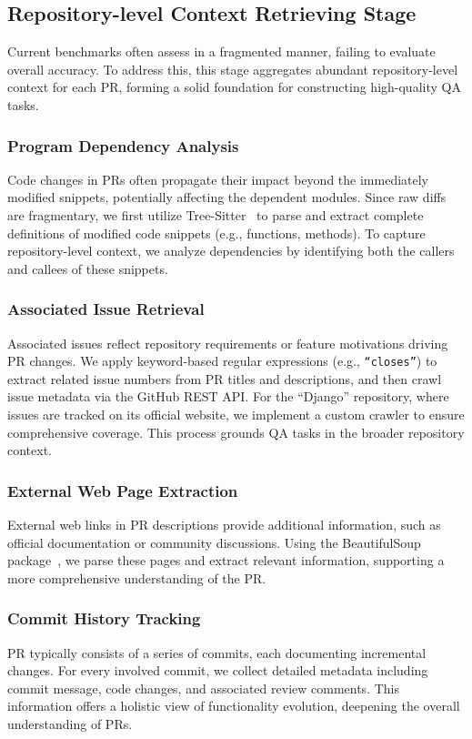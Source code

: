 \subsection{Repository-level Context Retrieving Stage}
\label{sec:stage2}

Current benchmarks often assess in a fragmented manner, failing to evaluate overall accuracy. To address this, this stage aggregates abundant repository-level context for each PR, forming a solid foundation for constructing high-quality QA tasks.

\subsubsection{Program Dependency Analysis}

Code changes in PRs often propagate their impact beyond the immediately modified snippets, potentially affecting the dependent modules. Since raw diffs are fragmentary, we first utilize Tree-Sitter~\cite{tree-sitter} to parse and extract complete definitions of modified code snippets (e.g., functions, methods). To capture repository-level context, we analyze dependencies by identifying both the callers and callees of these snippets. 

\subsubsection{Associated Issue Retrieval}
Associated issues reflect repository requirements or feature motivations driving PR changes. We apply keyword-based regular expressions (e.g., \texttt{``closes''}) to extract related issue numbers from PR titles and descriptions, and then crawl issue metadata via the GitHub REST API. For the ``Django'' repository, where issues are tracked on its official website, we implement a custom crawler to ensure comprehensive coverage. This process grounds QA tasks in the broader repository context.

\subsubsection{External Web Page Extraction}
External web links in PR descriptions provide additional information, such as official documentation or community discussions. Using the BeautifulSoup package~\cite{BeautifulSoup}, we parse these pages and extract relevant information, supporting a more comprehensive understanding of the PR.

\subsubsection{Commit History Tracking}
PR typically consists of a series of commits, each documenting incremental changes. For every involved commit, we collect detailed metadata including commit message, code changes, and associated review comments. This information offers a holistic view of functionality evolution, deepening the overall understanding of PRs.

